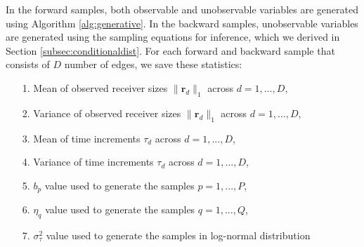 \documentclass[ba]{imsart}
\numberwithin{equation}{section}
\theoremstyle{plain}
\begin{document}
   In the forward samples, both observable and unobservable variables are generated using Algorithm \ref{alg:generative}. In the backward samples, unobservable variables are generated using the sampling equations for inference, which we derived in Section \ref{subsec:conditionaldist}. For each forward and backward sample that consists of $D$ number of edges, we save these statistics:
   \begin{itemize}
   	\item[1.] Mean of observed receiver sizes $ \lVert \boldsymbol{r}_{d} \rVert_1 $ across $d=1,\ldots,D$,
   	   	\item[2.] Variance of observed receiver sizes $ \lVert \boldsymbol{r}_{d} \rVert_1 $ across $d=1,\ldots,D$,
   	\item[3.] Mean of time increments $\tau_d$ across $d=1,...,D$,
   	   	\item[4.] Variance of time increments $\tau_d$ across $d=1,...,D$,
   	\item[5.] $b_p$ value used to generate the samples $p = 1,...,P$,
   	\item[6.] $\eta_q$ value used to generate the samples $q = 1,...,Q$,
   	\item[7.] $\sigma^2_\tau$ value used to generate the samples in log-normal distribution
   \end{itemize}
\end{document}
